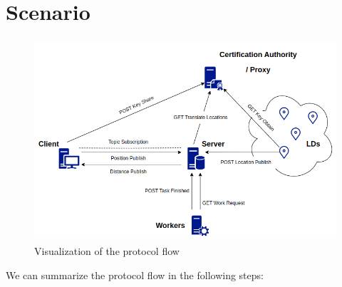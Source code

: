 
\newpage
\section{Scenario}


\begin{figure}[h]
    \centering
    \includegraphics[width=12cm,height=7.5cm]{img/workflow.png}
    \caption{Visualization of the protocol flow}
    \label{fig:protocol-flow}
\end{figure}

We can summarize the protocol flow in the following steps:

